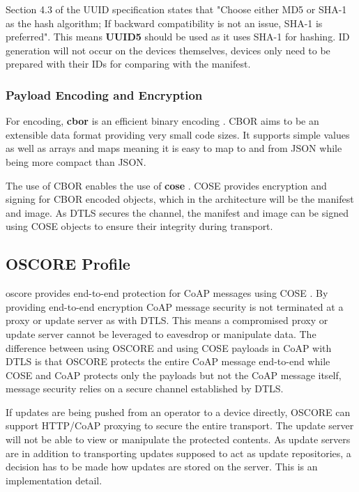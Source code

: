 \documentclass[0-thesis.tex]{subfiles}
\begin{document}
Section 4.3 of the UUID specification states that "Choose either MD5 or SHA-1 as the hash
algorithm; If backward compatibility is not an issue, SHA-1 is preferred". This means
\textbf{UUID5} should be used as it uses SHA-1 for hashing. ID generation will not occur
on the devices themselves, devices only need to be prepared with their IDs for comparing
with the manifest.

\subsubsection{Payload Encoding and Encryption}
\label{sssec:encoding-encryption}
For encoding, \textbf{\gls{cbor}} is an efficient binary encoding \parencite{rfc7049}.
CBOR aims to be an extensible data format providing very small code sizes. It supports
simple values as well as arrays and maps meaning it is easy to map to and from JSON while
being more compact than JSON. 

The use of CBOR enables the use of \textbf{\gls{cose}} \parencite{rfc8152}. COSE provides
encryption and signing for CBOR encoded objects, which in the architecture will be the
manifest and image. As DTLS secures the channel, the manifest and image can be signed
using COSE objects to ensure their integrity during transport. 

\subsection{OSCORE Profile}
\label{ssec:oscore-profile}
\acrfull{oscore} provides end-to-end protection for CoAP messages using COSE
\parencite{oscore}. By providing end-to-end encryption CoAP message security is not
terminated at a proxy or update server as with DTLS. This means a compromised proxy or
update server cannot be leveraged to eavesdrop or manipulate data. The difference between
using OSCORE and using COSE payloads in CoAP with DTLS is that OSCORE protects the entire
CoAP message end-to-end while COSE and CoAP protects only the payloads but not the CoAP
message itself, message security relies on a secure channel established by DTLS. 

If updates are being pushed from an operator to a device directly, OSCORE can support
HTTP/CoAP proxying to secure the entire transport. The update server will not be able to
view or manipulate the protected contents. As update servers are in addition to
transporting updates supposed to act as update repositories, a decision has to be made how
updates are stored on the server. This is an implementation detail.
\end{document}
